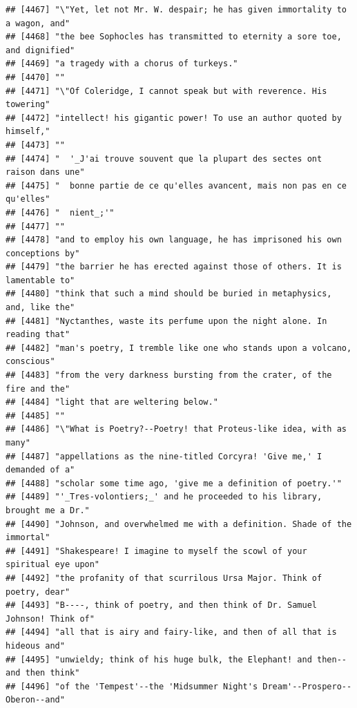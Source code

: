 \documentclass{article}\usepackage[]{graphicx}\usepackage[]{color}
\makeatletter
\newenvironment{kframe}{%
 \def\at@end@of@kframe{}%
 \ifinner\ifhmode%
  \def\at@end@of@kframe{\end{minipage}}%
  \begin{minipage}{\columnwidth}%
 \fi\fi%
 \def\FrameCommand##1{\hskip\@totalleftmargin \hskip-\fboxsep
 \colorbox{shadecolor}{##1}\hskip-\fboxsep
     \hskip-\linewidth \hskip-\@totalleftmargin \hskip\columnwidth}%
 \MakeFramed {\advance\hsize-\width
   \@totalleftmargin\z@ \linewidth\hsize
   \@setminipage}}%
 {\par\unskip\endMakeFramed%
 \at@end@of@kframe}
\newenvironment{knitrout}{}{} %
\makeatother
\begin{document}
\begin{knitrout}
\begin{kframe}
\begin{verbatim}
## [4467] "\"Yet, let not Mr. W. despair; he has given immortality to a wagon, and"     
## [4468] "the bee Sophocles has transmitted to eternity a sore toe, and dignified"     
## [4469] "a tragedy with a chorus of turkeys."                                         
## [4470] ""                                                                            
## [4471] "\"Of Coleridge, I cannot speak but with reverence. His towering"             
## [4472] "intellect! his gigantic power! To use an author quoted by himself,"          
## [4473] ""                                                                            
## [4474] "  '_J'ai trouve souvent que la plupart des sectes ont raison dans une"       
## [4475] "  bonne partie de ce qu'elles avancent, mais non pas en ce qu'elles"         
## [4476] "  nient_;'"                                                                  
## [4477] ""                                                                            
## [4478] "and to employ his own language, he has imprisoned his own conceptions by"    
## [4479] "the barrier he has erected against those of others. It is lamentable to"     
## [4480] "think that such a mind should be buried in metaphysics, and, like the"       
## [4481] "Nyctanthes, waste its perfume upon the night alone. In reading that"         
## [4482] "man's poetry, I tremble like one who stands upon a volcano, conscious"       
## [4483] "from the very darkness bursting from the crater, of the fire and the"        
## [4484] "light that are weltering below."                                             
## [4485] ""                                                                            
## [4486] "\"What is Poetry?--Poetry! that Proteus-like idea, with as many"             
## [4487] "appellations as the nine-titled Corcyra! 'Give me,' I demanded of a"         
## [4488] "scholar some time ago, 'give me a definition of poetry.'"                    
## [4489] "'_Tres-volontiers;_' and he proceeded to his library, brought me a Dr."      
## [4490] "Johnson, and overwhelmed me with a definition. Shade of the immortal"        
## [4491] "Shakespeare! I imagine to myself the scowl of your spiritual eye upon"       
## [4492] "the profanity of that scurrilous Ursa Major. Think of poetry, dear"          
## [4493] "B----, think of poetry, and then think of Dr. Samuel Johnson! Think of"      
## [4494] "all that is airy and fairy-like, and then of all that is hideous and"        
## [4495] "unwieldy; think of his huge bulk, the Elephant! and then--and then think"    
## [4496] "of the 'Tempest'--the 'Midsummer Night's Dream'--Prospero--Oberon--and"      

\end{verbatim}
\end{kframe}
\end{knitrout}
\end{document}

